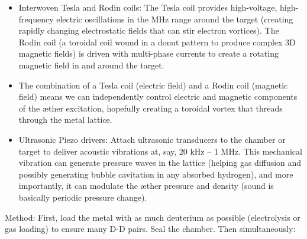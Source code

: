 \begin{itemize}

\item 
Interwoven Tesla and Rodin coils: The Tesla coil provides high-voltage, high-frequency electric oscillations in the MHz range around the target (creating rapidly changing electrostatic fields that can stir electron vortices). The Rodin coil (a toroidal coil wound in a donut pattern to produce complex 3D magnetic fields) is driven with multi-phase currents to create a rotating magnetic field in and around the target.




\item 
The combination of a Tesla coil (electric field) and a Rodin coil (magnetic field) means we can independently control electric and magnetic components of the æther excitation, hopefully creating a toroidal vortex that threads through the metal lattice.




\item 
Ultrasonic Piezo drivers: Attach ultrasonic transducers to the chamber or target to deliver acoustic vibrations at, say, 20 kHz – 1 MHz. This mechanical vibration can generate pressure waves in the lattice (helping gas diffusion and possibly generating bubble cavitation in any absorbed hydrogen), and more importantly, it can modulate the æther pressure and density (sound is basically periodic pressure change).




\end{itemize}

Method: First, load the metal with as much deuterium as possible (electrolysis or gas loading) to ensure many D-D pairs. Seal the chamber. Then simultaneously:


